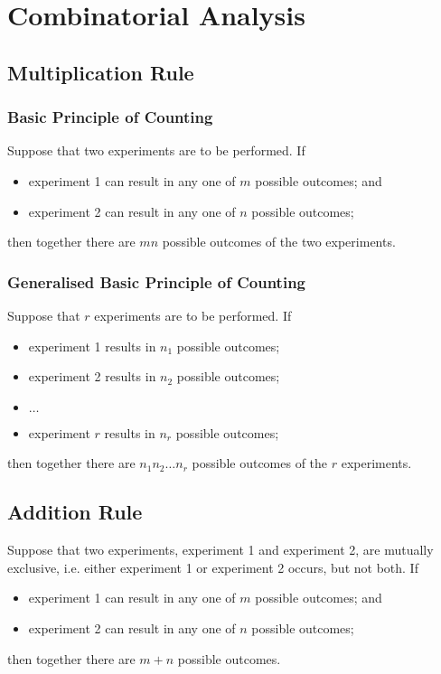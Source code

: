 \documentclass[../st2131_notes.tex]{subfiles}
\begin{document}
\chapter{Combinatorial Analysis}

\section{Multiplication Rule}
\subsection{Basic Principle of Counting}
Suppose that two experiments are to be performed. If
\begin{itemize}
	\item experiment 1 can result in any one of \(m\) possible outcomes; and
	\item experiment 2 can result in any one of \(n\) possible outcomes;
\end{itemize}
then together there are \(mn\) possible outcomes of the two experiments.

\subsection{Generalised Basic Principle of Counting}
Suppose that \(r\) experiments are to be performed. If
\begin{itemize}
	\item experiment 1 results in \(n_1\) possible outcomes;
	\item experiment 2 results in \(n_2\) possible outcomes;
	\item \(\ldots\)
	\item experiment \(r\) results in \(n_r\) possible outcomes;
\end{itemize}
then together there are \(n_1n_2\ldots n_r\) possible outcomes of the \(r\) experiments.

\section{Addition Rule}
Suppose that two experiments, experiment 1 and experiment 2, are mutually exclusive, i.e. either experiment 1 or experiment 2 occurs, but not both. If
\begin{itemize}
	\item experiment 1 can result in any one of \(m\) possible outcomes; and
	\item experiment 2 can result in any one of \(n\) possible outcomes;
\end{itemize}
then together there are \(m+n\) possible outcomes.
\end{document}
